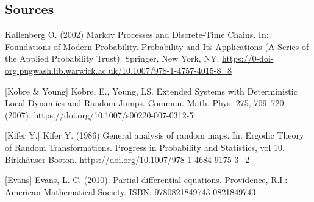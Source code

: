 \documentclass[pdftex,11pt,a4paper,oneside]{article}
\theoremstyle{plain}
\begin{document}
\newpage
\begin{appendix}
\section{Sources}
Kallenberg O. (2002) Markov Processes and Discrete-Time Chains. In: Foundations of Modern Probability. Probability and Its Applications (A Series of the Applied Probability Trust). Springer, New York, NY. \url{https://0-doi-org.pugwash.lib.warwick.ac.uk/10.1007/978-1-4757-4015-8_8}
\vspace{5mm}

[Kobre \& Young] Kobre, E., Young, LS. Extended Systems with Deterministic Local Dynamics and Random Jumps. Commun. Math. Phys. 275, 709–720 (2007). https://doi.org/10.1007/s00220-007-0312-5

\vspace{5mm}
[Kifer Y.] Kifer Y. (1986) General analysis of random maps. In: Ergodic Theory of Random Transformations. Progress in Probability and Statistics, vol 10. Birkhäuser Boston. \url{https://doi.org/10.1007/978-1-4684-9175-3_2}

\vspace{5mm}
[Evans] Evans, L. C. (2010). Partial differential equations. Providence, R.I.: American Mathematical Society. ISBN: 9780821849743 0821849743

\end{appendix}
\end{document}
